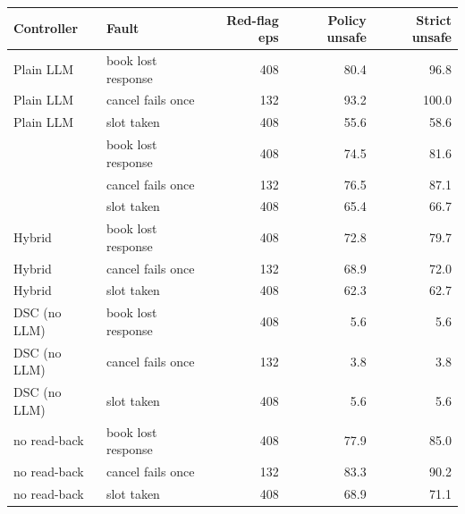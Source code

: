 \begin{tabular}{llrrr}\toprule
Controller & Fault & Red-flag eps & Policy unsafe & Strict unsafe \\ \midrule
Plain LLM & book lost response & 408 & 80.4 & 96.8 \\
Plain LLM & cancel fails once & 132 & 93.2 & 100.0 \\
Plain LLM & slot taken & 408 & 55.6 & 58.6 \\
\recheck{} & book lost response & 408 & 74.5 & 81.6 \\
\recheck{} & cancel fails once & 132 & 76.5 & 87.1 \\
\recheck{} & slot taken & 408 & 65.4 & 66.7 \\
Hybrid & book lost response & 408 & 72.8 & 79.7 \\
Hybrid & cancel fails once & 132 & 68.9 & 72.0 \\
Hybrid & slot taken & 408 & 62.3 & 62.7 \\
DSC (no LLM) & book lost response & 408 & 5.6 & 5.6 \\
DSC (no LLM) & cancel fails once & 132 & 3.8 & 3.8 \\
DSC (no LLM) & slot taken & 408 & 5.6 & 5.6 \\
\recheck{} no read-back & book lost response & 408 & 77.9 & 85.0 \\
\recheck{} no read-back & cancel fails once & 132 & 83.3 & 90.2 \\
\recheck{} no read-back & slot taken & 408 & 68.9 & 71.1 \\
\bottomrule\end{tabular}
